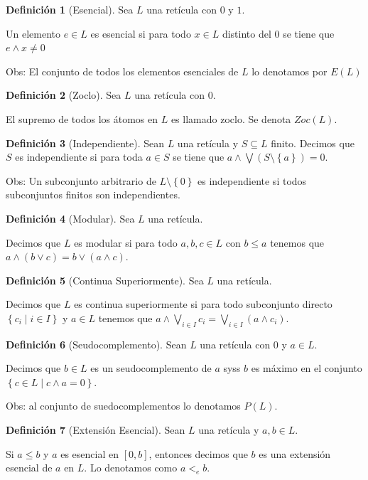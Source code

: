 \documentclass[12pt]{article}
\theoremstyle{plain}
\theoremstyle{definition}
\newtheorem{defi}{Definición}
\theoremstyle{plain}
\theoremstyle{plain}
\theoremstyle{plain}
\theoremstyle{remark}
\theoremstyle{remark}
\begin{document}
\begin{defi}[Esencial]
Sea $L$ una retícula con $0$ y $1$.\par
Un elemento $e\in L$ es esencial si para todo $x\in L$ distinto del $0$ se tiene que $e\wedge x\neq 0$
\end{defi}

Obs: El conjunto de todos los elementos esenciales de $L$ lo denotamos por $E\left(L\right)$

\begin{defi}[Zoclo]
Sea $L$ una retícula con $0$.\par
El supremo de todos los átomos en $L$ es llamado zoclo. Se denota $Zoc\left(L\right)$.
\end{defi}

\begin{defi}[Independiente]
Sean $L$ una retícula y $S\subseteq L$ finito. Decimos que $S$ es independiente si para toda $a\in S$ se tiene que $a\wedge\bigvee\left(S\setminus \left\{a\right\}\right)=0$.
\end{defi}

Obs: Un subconjunto arbitrario de $L\setminus\left\{0\right\}$ es independiente si todos subconjuntos finitos son independientes.

\begin{defi}[Modular]
Sea $L$ una retícula.\par
Decimos que $L$ es modular si para todo $a,b,c\in L$ con $b\leq a$ tenemos que $a\wedge\left(b\vee c\right)=b\vee\left(a\wedge c\right)$.
\end{defi}

\begin{defi}[Continua Superiormente]
Sea $L$ una retícula.\par
Decimos que $L$ es continua superiormente si para todo subconjunto directo $\left\{c_i\mid i\in I\right\}$ y $a\in L$ tenemos que $a\wedge\bigvee\limits_{i\in I} c_i=\bigvee\limits_{i\in I}\left(a\wedge c_i\right)$.
\end{defi}

\begin{defi}[Seudocomplemento]
Sean $L$ una retícula con $0$ y $a\in L$.\par
Decimos que $b\in L$ es un seudocomplemento de $a$ syss $b$ es máximo en el conjunto $\left\{c\in L\mid c\wedge a=0\right\}$.
\end{defi}

Obs: al conjunto de suedocomplementos lo denotamos $P\left(L\right)$.

\begin{defi}[Extensión Esencial]
Sean $L$ una retícula y $a,b\in L$.\par
Si $a\leq b$ y $a$ es esencial en $\left[0,b\right]$, entonces decimos que $b$ es una extensión esencial de $a$ en $L$. Lo denotamos como $a<_e b$.
\end{defi}
\end{document}
